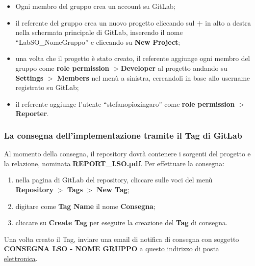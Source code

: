 \begin{tcolorbox}[colback=blue!20!white,colframe=blue!75!black,title=GitLab]
 \begin{itemize}
  \item Ogni membro del gruppo crea un account su GitLab;
  \item il referente del gruppo  crea un nuovo progetto cliccando sul \textbf{+} in alto a destra nella schermata principale di GitLab, inserendo il nome ``LabSO\_NomeGruppo'' e cliccando su \textbf{New Project};
  \item una volta che il progetto è stato creato, il referente aggiunge ogni membro del gruppo come \textbf{role permission} $>$\textbf{Developer} al progetto andando su \textbf{Settings} $>$ \textbf{Members} nel menù a sinistra, cercandoli in base allo username registrato su GitLab;
  \item il referente aggiunge l'utente ``stefanopiozingaro'' come \textbf{role permission} $>$ \textbf{Reporter}.
 \end{itemize}
\end{tcolorbox}

\subsubsection{La consegna dell'implementazione tramite il Tag di GitLab}

Al momento della consegna, il repository dovrà contenere i sorgenti del progetto
e la relazione, nominata \textbf{REPORT\_LSO.pdf}. Per effettuare la consegna:

\begin{enumerate}

 \item nella pagina di GitLab del repository, cliccare sulle voci del menù
       \textbf{Repository} $>$ \textbf{Tags} $>$ \textbf{New Tag};

 \item digitare come \textbf{Tag Name} il nome \textbf{Consegna};

 \item cliccare su \textbf{Create Tag} per eseguire la creazione del
       \textbf{Tag} di consegna.

\end{enumerate}

Una volta creato il Tag, inviare una email di notifica di consegna con soggetto
\textbf{CONSEGNA LSO - NOME GRUPPO} a
\href{mailto:stefanopio.zingaro@unibo.it}{questo indirizzo di posta
elettronica}.

